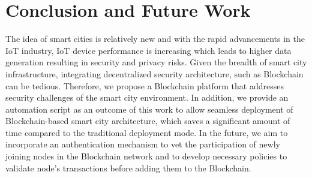 \section{Conclusion and Future Work}
\label{sec:Conclusion}
The idea of smart cities is relatively new and with the rapid advancements in the IoT industry, IoT device performance is increasing which leads to higher data generation resulting in security and privacy risks. Given the breadth of smart city infrastructure, integrating decentralized security architecture, such as Blockchain can be tedious. Therefore, we propose a Blockchain platform that addresses security challenges of the smart city environment. In addition, we provide an automation script as an outcome of this work to allow seamless deployment of Blockchain-based smart city architecture, which saves a significant amount of time compared to the traditional deployment mode. In the future, we aim to incorporate an authentication mechanism to vet the participation of newly joining nodes in the Blockchain network and to develop necessary policies to validate node's transactions before adding them to the Blockchain.
